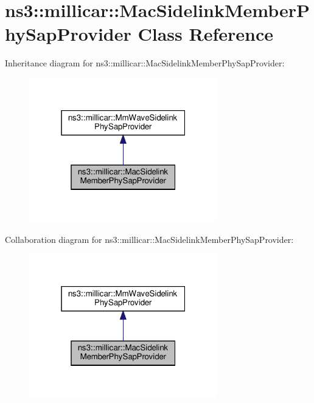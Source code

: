 \hypertarget{classns3_1_1millicar_1_1MacSidelinkMemberPhySapProvider}{}\section{ns3\+:\+:millicar\+:\+:Mac\+Sidelink\+Member\+Phy\+Sap\+Provider Class Reference}
\label{classns3_1_1millicar_1_1MacSidelinkMemberPhySapProvider}


Inheritance diagram for ns3\+:\+:millicar\+:\+:Mac\+Sidelink\+Member\+Phy\+Sap\+Provider\+:\nopagebreak
\begin{figure}[H]
\begin{center}
\leavevmode
\includegraphics[width=232pt]{classns3_1_1millicar_1_1MacSidelinkMemberPhySapProvider__inherit__graph}
\end{center}
\end{figure}


Collaboration diagram for ns3\+:\+:millicar\+:\+:Mac\+Sidelink\+Member\+Phy\+Sap\+Provider\+:\nopagebreak
\begin{figure}[H]
\begin{center}
\leavevmode
\includegraphics[width=232pt]{classns3_1_1millicar_1_1MacSidelinkMemberPhySapProvider__coll__graph}
\end{center}
\end{figure}
